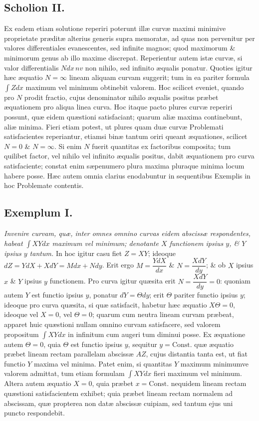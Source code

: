 \subsection*{Scholion II.}
Ex eadem etiam solutione reperiri poterunt illæ curvæ maximi minimive proprietate præditæ alterius generis supra memoratæ, ad quas non pervenitur per valores differentiales evanescentes, sed infinite magnos; quod maximorum \& minimorum genus ab illo maxime discrepat. Reperientur autem istæ curvæ, si valor differentialis $Ndx\,nv$ non nihilo, sed infinito æqualis ponatur. Quoties igitur hæc æquatio $N=\infty$ lineam aliquam curvam suggerit; tum in ea pariter formula $\int Zdx$ maximum vel minimum obtinebit valorem. Hoc scilicet eveniet, quando pro $N$ prodit fractio, cujus denominator nihilo æqualis positus præbet æquationem pro aliqua linea curva. Hoc itaque pacto plures curvæ reperiri possunt, quæ eidem quæstioni satisfaciant; quarum aliæ maxima continebunt, aliæ minima. Fieri etiam potest, ut plures quam duæ curvæ Problemati satisfacientes reperiantur, etiamsi binæ tantum oriri queant æquationes, scilicet $N=0$ \& $N=\infty$. Si enim $N$ fuerit quantitas ex factoribus composita; tum quilibet factor, vel nihilo vel infinito æqualis positus, dabit æquationem pro curva satisfaciente; constat enim sæpenumero plura maxima pluraque minima locum habere posse. Hæc autem omnia clarius enodabuntur in sequentibus Exemplis in hoc Problemate contentis.

\subsection*{Exemplum I.}
\textit{Invenire curvam, quæ, inter omnes omnino curvas eidem abscissæ respondentes, habeat $\int XYdx$ maximum vel minimum; denotante $X$ functionem ipsius $y$, \& $Y$ ipsius $y$ tantum.}
In hoc igitur casu fiet $Z=XY$; ideoque $dZ=YdX+XdY=Mdx+Ndy$. Erit ergo $M=\dfrac{YdX}{dx}$ \& $N=\dfrac{XdY}{dy}$; \& ob $X$ ipsius $x$ \& $Y$ ipsius $y$ functionem. Pro curva igitur quæsita erit $N=\dfrac{XdY}{dy}=0$: quoniam autem $Y$ est functio ipsius $y$, ponatur $dY=\Theta dy$; erit $\Theta$ pariter functio ipsius $y$; ideoque pro curva quæsita, si quæ satisfacit, habetur hæc æquatio $X\Theta=0$, ideoque vel $X=0$, vel $\Theta=0$; quarum cum neutra lineam curvam præbeat, apparet huic quæstioni nullam omnino curvam satisfacere, sed valorem propositum $\int XYdx$ in infinitum cum augeri tum diminui posse. Ex æquatione autem $\Theta=0$, quia $\Theta$ est functio ipsius $y$, sequitur $y=\mathrm{Const.}$ quæ æquatio præbet lineam rectam parallelam abscissæ $AZ$, cujus distantia tanta est, ut fiat functio $Y$ maxima vel minima. Patet enim, si quantitas $Y$ maximum minimumve valorem admittat, tum etiam formulam $\int XYdx$ fieri maximum vel minimum. Altera autem æquatio $X=0$, quia præbet $x=\mathrm{Const.}$ nequidem lineam rectam quæstioni satisfacientem exhibet; quia præbet lineam rectam normalem ad abscissam, quæ propterea non datæ abscissæ cuipiam, sed tantum ejus uni puncto respondebit.

